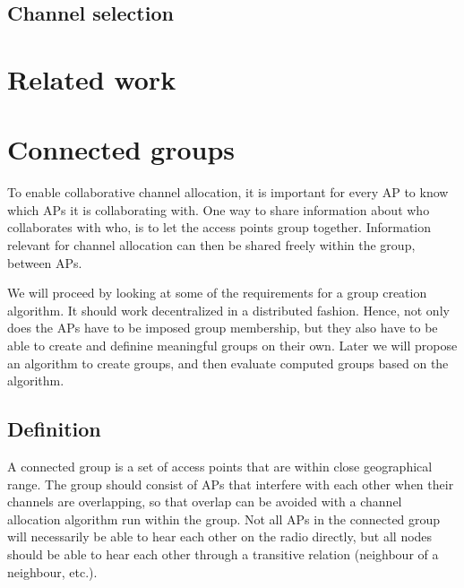 \documentclass[a4paper,UKenglish]{report}
\begin{document}
\section{Channel selection} 


\chapter{Related work}

\chapter{Connected groups}
To enable collaborative channel allocation, it is important for every AP to know which APs it is collaborating with.
One way to share information about who collaborates with who, is to let the access points group together. Information relevant for channel
allocation can then be shared freely within the group, between APs.

We will proceed by looking at some of the requirements for a group creation algorithm. It should work decentralized in a distributed fashion.
Hence, not only does the APs have to be imposed group membership, but they also have to be able to create and definine meaningful groups on their own.
Later we will propose an algorithm to create groups, and then evaluate computed groups based on the algorithm.


\section{Definition}
A connected group is a set of access points that are within close geographical range. The group should consist of APs that
interfere with each other when their channels are overlapping, so that overlap can be avoided with a channel allocation algorithm run within the group.
Not all APs in the connected group will necessarily be able to hear each other on the radio directly,
but all nodes should be able to hear each other through a transitive relation (neighbour of a neighbour, etc.).
\end{document}
